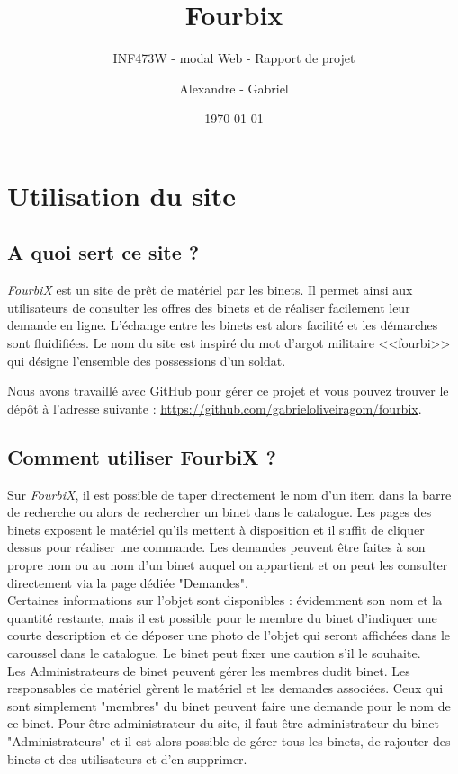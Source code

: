 \documentclass[titlepage,11pt,a4paper]{article}
\title{Fourbix}
\subtitle{INF473W - modal Web - Rapport de projet}
\author{Alexandre \bsc{Binninger} - Gabriel \bsc{Oliveira Martins}}
\date{\today}
\begin{document}
\maketitle

\clearpage

\setcounter{page}{1}


\section{Utilisation du site}

\subsection{A quoi sert ce site ?}

\emph{FourbiX} est un site de prêt de matériel par les binets. Il permet ainsi aux utilisateurs de consulter les offres des binets et de réaliser facilement leur demande en ligne. L'échange entre les binets est alors facilité et les démarches sont fluidifiées. Le nom du site est inspiré du mot d'argot militaire <<fourbi>> qui désigne l'ensemble des possessions d'un soldat.

Nous avons travaillé avec GitHub pour gérer ce projet et vous pouvez trouver le dépôt à l'adresse suivante : \url{https://github.com/gabrieloliveiragom/fourbix}. 


\subsection{Comment utiliser FourbiX ?}

Sur \emph{FourbiX}, il est possible de taper directement le nom d'un item dans la barre de recherche ou alors de rechercher un binet dans le catalogue. Les pages des binets exposent le matériel qu'ils mettent à disposition et il suffit de cliquer dessus pour réaliser une commande. Les demandes peuvent être faites à son propre nom ou au nom d'un binet auquel on appartient et on peut les consulter directement via la page dédiée "Demandes".\\

Certaines informations sur l'objet sont disponibles : évidemment son nom et la quantité restante, mais il est possible pour le membre du binet d'indiquer une courte description et de déposer une photo de l'objet qui seront affichées dans le caroussel dans le catalogue. Le binet peut fixer une caution s'il le souhaite.\\

Les Administrateurs de binet peuvent gérer les membres dudit binet. Les responsables de matériel gèrent le matériel et les demandes associées. Ceux qui sont simplement "membres" du binet peuvent faire une demande pour le nom de ce binet. Pour être administrateur du site, il faut être administrateur du binet "Administrateurs" et il est alors possible de gérer tous les binets, de rajouter des binets et des utilisateurs et d'en supprimer.\\
\end{document}
